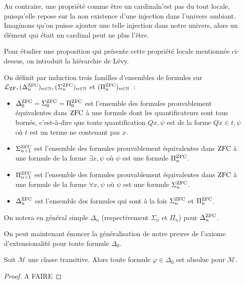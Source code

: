 Au contraire, une propriété comme \og être un cardinal\fg n'est pas du tout
locale, puisqu'elle repose sur la non existence d'une injection dans l'univers
ambiant. Imaginons qu'on puisse ajouter une telle injection dans notre univers,
alors un élément qui était un cardinal peut ne plus l'être.

Pour étudier une proposition qui présente cette propriété locale mentionnée
ci-dessus, on introduit la hiérarchie de Lévy.

\begin{definition}
  On définit par induction trois familles d'ensembles de formules sur
  $\mathcal L_{\operatorname{ZF}}, (\Delta^{\operatorname{ZFC}}_n)_{n\in\mathbb N},
  (\Sigma^{\operatorname{ZFC}}_n)_{n\in\mathbb N}$
  et $(\Pi^{\operatorname{ZFC}}_n)_{n \in \mathbb N}$~:
  \begin{itemize}
  \item $\Delta^{\operatorname{ZFC}}_0=\Sigma^{\operatorname{ZFC}}_0=\Pi^{\operatorname{ZFC}}_0$ est l'ensemble des formules
    prouvablement équivalentes dans $\operatorname{ZFC}$ à une formule dont les
    quantificateurs sont tous bornés, c'est-à-dire que toute quantification
    $Q x, \psi$ est de la forme $Q x \in t, \psi$ où $t$ est un terme ne
    contenant pas $x$.
  \item $\Sigma^{\operatorname{ZFC}}_{n+1}$ est l'ensemble des formules prouvablement
    équivalentes
    dans $\operatorname{ZFC}$ à une formule de la forme
    $\exists x, \psi$ où $\psi$ est une formule $\Pi^{\operatorname{ZFC}}_n$.
  \item $\Pi^{\operatorname{ZFC}}_{n+1}$ est l'ensemble des formules prouvablement équivalentes
    dans $\operatorname{ZFC}$ à une formule de la forme $\forall x, \psi$ où $\psi$ est une
    formule $\Sigma^{\operatorname{ZFC}}_n$.
  \item $\Delta^{\operatorname{ZFC}}_n$ est l'ensemble des formules qui sont à la fois
    $\Sigma^{\operatorname{ZFC}}_n$ et $\Pi^{\operatorname{ZFC}}_n$.
  \end{itemize}

  On notera en général simple $\Delta_n$ (respectivement $\Sigma_n$ et $\Pi_n$)
  pour $\Delta^{\operatorname{ZFC}}_n$.
\end{definition}

On peut maintenant énoncer la généralisation de notre preuve de l'axiome
d'extensionalité pour toute formule $\Delta_0$.

\begin{proposition}
  Soit $\mathcal M$ une classe transitive. Alors toute formule
  $\varphi\in\Delta_0$ est absolue pour $\mathcal M$.
\end{proposition}

\begin{proof}
  A FAIRE
\end{proof}

